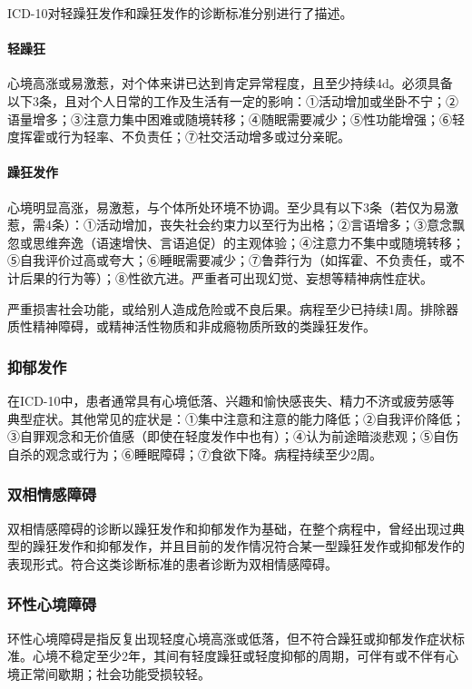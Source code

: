 ICD-10对轻躁狂发作和躁狂发作的诊断标准分别进行了描述。
\paragraph{轻躁狂}

心境高涨或易激惹，对个体来讲已达到肯定异常程度，且至少持续4d。必须具备以下3条，且对个人日常的工作及生活有一定的影响：①活动增加或坐卧不宁；②语量增多；③注意力集中困难或随境转移；④随眠需要减少；⑤性功能增强；⑥轻度挥霍或行为轻率、不负责任；⑦社交活动增多或过分亲昵。
\paragraph{躁狂发作}

心境明显高涨，易激惹，与个体所处环境不协调。至少具有以下3条（若仅为易激惹，需4条）：①活动增加，丧失社会约束力以至行为出格；②言语增多；③意念飘忽或思维奔逸（语速增快、言语追促）的主观体验；④注意力不集中或随境转移；⑤自我评价过高或夸大；⑥睡眠需要减少；⑦鲁莽行为（如挥霍、不负责任，或不计后果的行为等）；⑧性欲亢进。严重者可出现幻觉、妄想等精神病性症状。

严重损害社会功能，或给别人造成危险或不良后果。病程至少已持续1周。排除器质性精神障碍，或精神活性物质和非成瘾物质所致的类躁狂发作。

\subsubsection{抑郁发作}

在ICD-10中，患者通常具有心境低落、兴趣和愉快感丧失、精力不济或疲劳感等典型症状。其他常见的症状是：①集中注意和注意的能力降低；②自我评价降低；③自罪观念和无价值感（即使在轻度发作中也有）；④认为前途暗淡悲观；⑤自伤自杀的观念或行为；⑥睡眠障碍；⑦食欲下降。病程持续至少2周。

\subsubsection{双相情感障碍}

双相情感障碍的诊断以躁狂发作和抑郁发作为基础，在整个病程中，曾经出现过典型的躁狂发作和抑郁发作，并且目前的发作情况符合某一型躁狂发作或抑郁发作的表现形式。符合这类诊断标准的患者诊断为双相情感障碍。

\subsubsection{环性心境障碍}

环性心境障碍是指反复出现轻度心境高涨或低落，但不符合躁狂或抑郁发作症状标准。心境不稳定至少2年，其间有轻度躁狂或轻度抑郁的周期，可伴有或不伴有心境正常间歇期；社会功能受损较轻。

